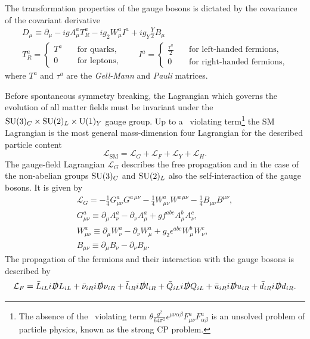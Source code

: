 The transformation properties of the gauge bosons is dictated by the covariance of the covariant derivative
\begin{equation}
\begin{gathered}
D_\mu \equiv \partial_\mu - i g A^a_\mu T_R^a - i g_2 W_\mu^a I^a + i g_Y \frac{Y}{2} B_\mu \\
T_R^a = \begin{cases} T^a \quad &\text{for quarks}, \\
  0 \quad &\text{for leptons},
\end{cases}
\qquad I^a = \begin{cases} \frac{\tau^a}{2} \quad &\text{for left-handed fermions}, \\
  0 \quad &\text{for right-handed fermions},
\end{cases}
\end{gathered}
\label{eq:2:covariant_derivative}
\end{equation}
where $T^a$ and $\tau^a$ are the \textit{Gell-Mann} and \textit{Pauli} matrices.

Before spontaneous symmetry breaking, the Lagrangian which governs the evolution of all matter fields must be invariant under the $\mathrm{SU}(3)_C \times \mathrm{SU}(2)_L \times \mathrm{U}(1)_Y$ gauge group. Up to a \Charge\Parity\ violating term\footnote{The absence of the \Charge\Parity\ violating term $\theta \frac{g^2}{64 \pi^2}\epsilon^{\mu \nu \alpha \beta} F^{a}_{\mu \nu} F^{a}_{\alpha \beta}$ is an unsolved problem of particle physics, known as the strong CP problem.} the SM Lagrangian is the most general mass-dimension four Lagrangian for the described particle content
\begin{equation}
\mathcal{L}_\mathrm{SM} = \mathcal{L}_G + \mathcal{L}_F + \mathcal{L}_Y + \mathcal{L}_H.
\end{equation}
The gauge-field Lagrangian $\mathcal{L}_G$ describes the free propagation and in the case of the non-abelian groups $\mathrm{SU}(3)_C$ and $\mathrm{SU}(2)_L$ also the self-interaction of the gauge bosons. It is given by
\begin{equation}
\begin{gathered}
\mathcal{L}_G = - \frac{1}{4} G^{a}_{\mu \nu} G^{a\, \mu\nu} - \frac{1}{4} W^a_{\mu \nu} W^{a\, \mu\nu} - \frac{1}{4} B_{\mu\nu} B^{\mu \nu}, \\
G^a_{\mu\nu} \equiv \partial_\mu A^a_\nu - \partial_\nu A^a_\mu + g f^{abc} A^b_\mu A^c_\nu, \\
W^a_{\mu\nu} \equiv \partial_\mu W^a_\nu - \partial_\nu W^a_\mu + g_2 \epsilon^{abc} W^b_\mu W^c_\nu, \\
B_{\mu\nu} \equiv \partial_\mu B_\nu - \partial_\nu B_\mu.
\end{gathered}
\end{equation}
The propagation of the fermions and their interaction with the gauge bosons is described by
\begin{equation}
\mathcal{L}_F = \bar{L}_{iL} i \slashed{D} L_{iL} + \bar{\nu}_{iR} i \slashed{D} \nu_{iR} + \bar{l}_{iR} i \slashed{D} l_{iR} + \bar{Q}_{iL} i \slashed{D} Q_{iL} + \bar{u}_{iR} i \slashed{D} u_{iR} + \bar{d}_{iR} i \slashed{D} d_{iR}.
\end{equation}


